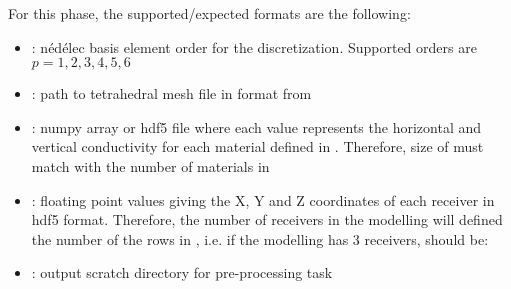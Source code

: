 \documentclass[letterpaper,10pt,english]{sphinxmanual}
\begin{document}
For this phase, the supported/expected formats are the following:
\begin{itemize}
\item {} 
: nédélec basis element order for the discretization. Supported orders are \(p=1,2,3,4,5,6\)

\item {} 
: path to tetrahedral mesh file in format from 

\item {} 
: numpy array or hdf5 file where each value represents the horizontal and vertical conductivity for each material defined in . Therefore, size of  must match with the number of materials in 

\item {} 
: floating point values giving the X, Y and Z coordinates of each receiver in hdf5 format. Therefore, the number of receivers in the modelling will defined the number of the rows in , i.e. if the modelling has 3 receivers,  should be:

\begin{sphinxVerbatim}[commandchars=\\\{\}]
     
     
     
\end{sphinxVerbatim}

\item {} 
: output scratch directory for pre-processing task

\end{itemize}
\end{document}
